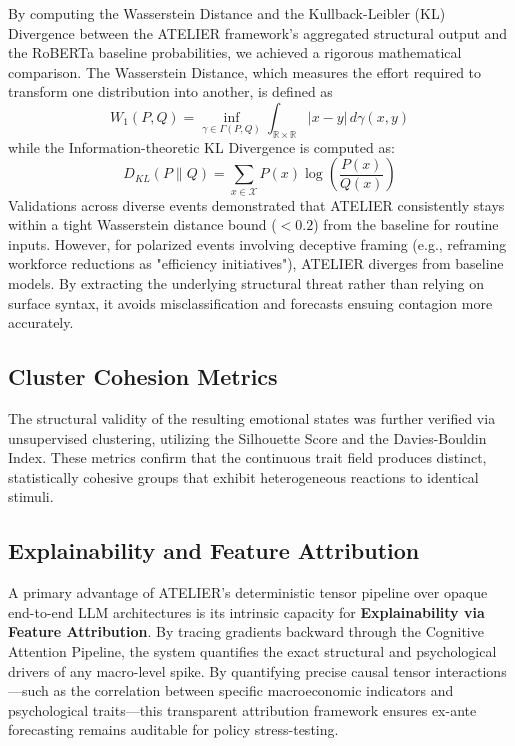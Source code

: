 \documentclass[12pt]{IEEEtran}
\begin{document}
By computing the Wasserstein Distance and the Kullback-Leibler (KL) Divergence between the ATELIER framework's aggregated structural output and the RoBERTa baseline probabilities, we achieved a rigorous mathematical comparison. The Wasserstein Distance, which measures the effort required to transform one distribution into another, is defined as
\begin{equation}
W_1(P, Q) = \inf_{\gamma \in \Gamma(P, Q)} \int_{\mathbb{R} \times \mathbb{R}} |x - y| \, d\gamma(x, y)
\end{equation}
while the Information-theoretic KL Divergence is computed as:
\begin{equation}
D_{KL}(P \parallel Q) = \sum_{x \in \mathcal{X}} P(x) \log\left(\frac{P(x)}{Q(x)}\right)
\end{equation}
Validations across diverse events demonstrated that ATELIER consistently stays within a tight Wasserstein distance bound ($<0.2$) from the baseline for routine inputs. However, for polarized events involving deceptive framing (e.g., reframing workforce reductions as "efficiency initiatives"), ATELIER diverges from baseline models. By extracting the underlying structural threat rather than relying on surface syntax, it avoids misclassification and forecasts ensuing contagion more accurately.

\subsection{Cluster Cohesion Metrics}
The structural validity of the resulting emotional states was further verified via unsupervised clustering, utilizing the Silhouette Score and the Davies-Bouldin Index. These metrics confirm that the continuous trait field produces distinct, statistically cohesive groups that exhibit heterogeneous reactions to identical stimuli.

\subsection{Explainability and Feature Attribution}
A primary advantage of ATELIER's deterministic tensor pipeline over opaque end-to-end LLM architectures is its intrinsic capacity for \textbf{Explainability via Feature Attribution}. By tracing gradients backward through the Cognitive Attention Pipeline, the system quantifies the exact structural and psychological drivers of any macro-level spike. By quantifying precise causal tensor interactions—such as the correlation between specific macroeconomic indicators and psychological traits—this transparent attribution framework ensures ex-ante forecasting remains auditable for policy stress-testing.
\end{document}
